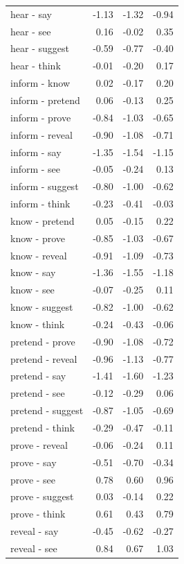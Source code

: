 \begin{longtable}{lrrr}
  hear - say & -1.13 & -1.32 & -0.94 \\ 
  hear - see & 0.16 & -0.02 & 0.35 \\ 
  hear - suggest & -0.59 & -0.77 & -0.40 \\ 
  hear - think & -0.01 & -0.20 & 0.17 \\ 
  inform - know & 0.02 & -0.17 & 0.20 \\ 
  inform - pretend & 0.06 & -0.13 & 0.25 \\ 
  inform - prove & -0.84 & -1.03 & -0.65 \\ 
  inform - reveal & -0.90 & -1.08 & -0.71 \\ 
  inform - say & -1.35 & -1.54 & -1.15 \\ 
  inform - see & -0.05 & -0.24 & 0.13 \\ 
  inform - suggest & -0.80 & -1.00 & -0.62 \\ 
  inform - think & -0.23 & -0.41 & -0.03 \\ 
  know - pretend & 0.05 & -0.15 & 0.22 \\ 
  know - prove & -0.85 & -1.03 & -0.67 \\ 
  know - reveal & -0.91 & -1.09 & -0.73 \\ 
  know - say & -1.36 & -1.55 & -1.18 \\ 
  know - see & -0.07 & -0.25 & 0.11 \\ 
  know - suggest & -0.82 & -1.00 & -0.62 \\ 
  know - think & -0.24 & -0.43 & -0.06 \\ 
  pretend - prove & -0.90 & -1.08 & -0.72 \\ 
  pretend - reveal & -0.96 & -1.13 & -0.77 \\ 
  pretend - say & -1.41 & -1.60 & -1.23 \\ 
  pretend - see & -0.12 & -0.29 & 0.06 \\ 
  pretend - suggest & -0.87 & -1.05 & -0.69 \\ 
  pretend - think & -0.29 & -0.47 & -0.11 \\ 
  prove - reveal & -0.06 & -0.24 & 0.11 \\ 
  prove - say & -0.51 & -0.70 & -0.34 \\ 
  prove - see & 0.78 & 0.60 & 0.96 \\ 
  prove - suggest & 0.03 & -0.14 & 0.22 \\ 
  prove - think & 0.61 & 0.43 & 0.79 \\ 
  reveal - say & -0.45 & -0.62 & -0.27 \\ 
  reveal - see & 0.84 & 0.67 & 1.03 \\ 

\end{longtable}
